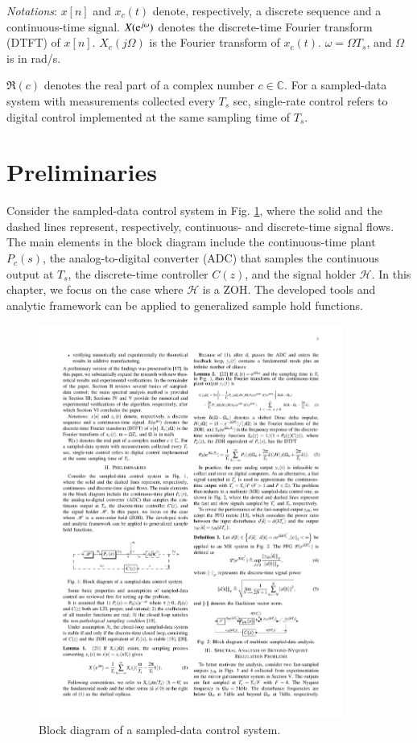 \documentclass [11pt, proquest] {uwthesis}[2020/02/24]
\begin{document}
\emph{Notations}: \label{sec:We-use-the}$x\left[n\right]$ and $x_{c}\left(t\right)$
denote, respectively, a discrete sequence and a continuous-time signal.
$X(\mathrm{e}^{j\omega})$ denotes the discrete-time Fourier transform (DTFT)
of $x\left[n\right]$. $X_{c}(j\Omega)$ is the Fourier transform
of $x_{c}\left(t\right)$. $\omega=\Omega T_{s}$, and $\Omega$ is
in rad/s. 

$\Re(c)$ denotes the real part of a complex number $c\in\mathbb{C}$.
For a sampled-data system with measurements collected every $T_{s}$
sec, single-rate control refers to digital control implemented at
the same sampling time of $T_{s}$.

\section{Preliminaries} \label{sec:Problem-Formulation}

Consider the sampled-data control system in Fig. \ref{fig:Block-diagram-of},
where the solid and the dashed lines represent, respectively, continuous-
and discrete-time signal flows. The main elements in the block diagram
include the continuous-time plant $P_{c}\left(s\right)$, the analog-to-digital
converter (ADC) that samples the continuous output at $T_{s}$, the
discrete-time controller $C\left(z\right)$, and the signal holder
$\mathscr{H}$. In this chapter, we focus on the case where $\mathscr{H}$
is a ZOH. The developed tools and analytic framework
can be applied to generalized sample hold functions.
\begin{figure}[!ht]
\begin{centering}
\includegraphics[width=10cm]{Spectral-analysis/FIG1.pdf}
\par\end{centering}
\caption{\label{fig:Block-diagram-of}Block diagram of a sampled-data control
system.}
\end{figure}
\end{document}
